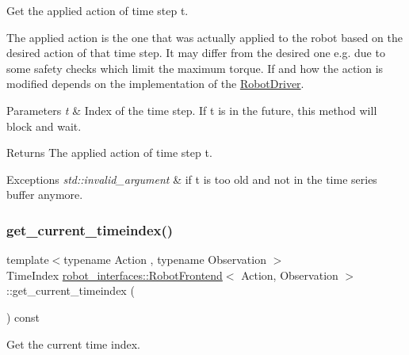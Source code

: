 Get the applied action of time step t. 

The applied action is the one that was actually applied to the robot based on the desired action of that time step. It may differ from the desired one e.\+g. due to some safety checks which limit the maximum torque. If and how the action is modified depends on the implementation of the \hyperlink{classrobot__interfaces_1_1RobotDriver}{Robot\+Driver}.


\begin{DoxyParams}{Parameters}
{\em t} & Index of the time step. If t is in the future, this method will block and wait. \\
\hline
\end{DoxyParams}
\begin{DoxyReturn}{Returns}
The applied action of time step t. 
\end{DoxyReturn}

\begin{DoxyExceptions}{Exceptions}
{\em std\+::invalid\+\_\+argument} & if t is too old and not in the time series buffer anymore. \\
\hline
\end{DoxyExceptions}
\mbox{\label{classrobot__interfaces_1_1RobotFrontend_a6a2120216c6154216994b562c0e7a7b2}} 
\subsubsection{\texorpdfstring{get\+\_\+current\+\_\+timeindex()}{get\_current\_timeindex()}}
{\footnotesize\ttfamily template$<$typename Action , typename Observation $>$ \\
Time\+Index \hyperlink{classrobot__interfaces_1_1RobotFrontend}{robot\+\_\+interfaces\+::\+Robot\+Frontend}$<$ Action, Observation $>$\+::get\+\_\+current\+\_\+timeindex (\begin{DoxyParamCaption}{ }\end{DoxyParamCaption}) const\hspace{0.3cm}{\ttfamily [inline]}}



Get the current time index. 

